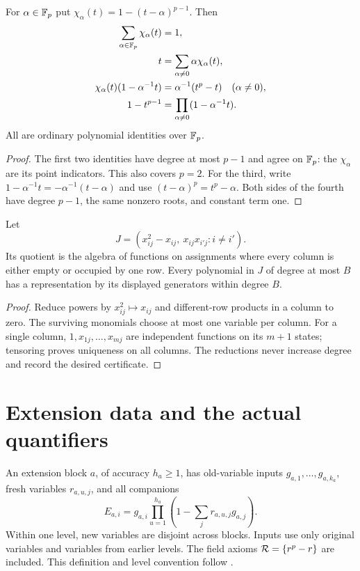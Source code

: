 \begin{lemma}\label{lem:selectors}
For $\alpha\in\mathbb F_p$ put $\chi_\alpha(t)=1-(t-\alpha)^{p-1}$. Then
\begin{align}
 \sum_{\alpha\in\mathbb F_p}\chi_\alpha(t)&=1,\label{eq:selectorpartition}\\
 t&=\sum_{\alpha\ne0}\alpha\chi_\alpha(t),\label{eq:selectorlinear}\\
 \chi_\alpha(t)(1-\alpha^{-1}t)&=\alpha^{-1}(t^p-t)
       \quad(\alpha\ne0),\label{eq:selectorproduct}\\
 1-t^{p-1}&=\prod_{\alpha\ne0}(1-\alpha^{-1}t).
 \label{eq:factorzero}
\end{align}
All are ordinary polynomial identities over $\mathbb F_p$.
\end{lemma}
\begin{proof}
The first two identities have degree at most $p-1$ and agree on $\mathbb F_p$: the $\chi_\alpha$ are its point indicators. This also covers $p=2$. For the third, write $1-\alpha^{-1}t=-\alpha^{-1}(t-\alpha)$ and use $(t-\alpha)^p=t^p-\alpha$. Both sides of the fourth have degree $p-1$, the same nonzero roots, and constant term one.
\end{proof}

\begin{lemma}\label{lem:columnnf}
Let
\[
 J=(x_{ij}^2-x_{ij},\ x_{ij}x_{i'j}:i\ne i').
\]
Its quotient is the algebra of functions on assignments where every column is either empty or occupied by one row. Every polynomial in $J$ of degree at most $B$ has a representation by its displayed generators within degree $B$.
\end{lemma}
\begin{proof}
Reduce powers by $x_{ij}^2\mapsto x_{ij}$ and different-row products in a column to zero. The surviving monomials choose at most one variable per column. For a single column, $1,x_{1j},\ldots,x_{mj}$ are independent functions on its $m+1$ states; tensoring proves uniqueness on all columns. The reductions never increase degree and record the desired certificate.
\end{proof}

\section{Extension data and the actual quantifiers}
An extension block $a$, of accuracy $h_a\ge1$, has old-variable inputs $g_{a,1},\ldots,g_{a,k_a}$, fresh variables $r_{a,u,j}$, and all companions
\begin{equation}\label{eq:ens}
 E_{a,i}=g_{a,i}\prod_{u=1}^{h_a}
 \left(1-\sum_jr_{a,u,j}g_{a,j}\right).
\end{equation}
Within one level, new variables are disjoint across blocks. Inputs use only original variables and variables from earlier levels. The field axioms $\mathcal R=\{r^p-r\}$ are included. This definition and level convention follow \cite[Definition 2.1]{Krajicek}.

